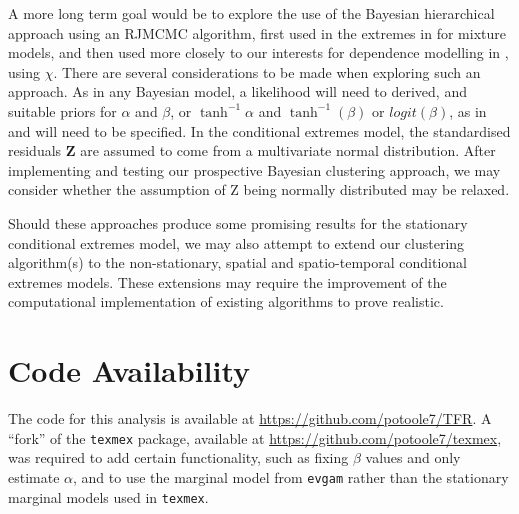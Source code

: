 \documentclass{article}
\numberwithin{equation}{section}
\begin{document}
A more long term goal would be to explore the use of the Bayesian hierarchical approach using an RJMCMC algorithm, first used in the extremes in \citet{Bottolo2003} for mixture models, and then used more closely to our interests for dependence modelling in \citet{Rohrbeck2021}, using $\chi$.
There are several considerations to be made when exploring such an approach. 
As in any Bayesian model, a likelihood will need to derived, and suitable priors for $\alpha$ and $\beta$, or $\tanh^{-1}{\alpha}$ and $\tanh^{-1}(\beta)$ or $logit(\beta)$, as in \citet{Winter2016} and \citet{Richards2023} will need to be specified. 
In the conditional extremes model, the standardised residuals $\bm{Z}$ are assumed to come from a multivariate normal distribution. 
After implementing and testing our prospective Bayesian clustering approach, we may consider whether the assumption of Z being normally distributed may be relaxed.

Should these approaches produce some promising results for the stationary conditional extremes model, we may also attempt to extend our clustering algorithm(s) to the non-stationary, spatial and spatio-temporal conditional extremes models.
These extensions may require the improvement of the computational implementation of existing algorithms to prove realistic.

\section*{Code Availability}

The code for this analysis is available at \url{https://github.com/potoole7/TFR}.
A ``fork'' of the \texttt{texmex} package, available at \url{https://github.com/potoole7/texmex}, was required to add certain functionality, such as fixing $\beta$ values and only estimate $\alpha$, and to use the marginal model from \texttt{evgam} rather than the stationary marginal models used in \texttt{texmex}.


\newpage

\end{document}
